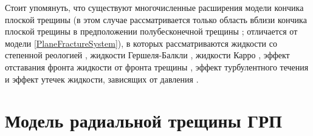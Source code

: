 Стоит упомянуть, что существуют многочисленные расширения модели кончика плоской трещины (в этом случае рассматривается только область вблизи кончика плоской трещины в предположении полубесконечной трещины \cite{baykin_course}; отличается от модели \eqref{PlaneFractureSystem}), в которых рассматриваются жидкости со степенной реологией \cite{dontsov_kresse}, жидкости Гершеля-Балкли \cite{bessmertnykh}, жидкости Карро \cite{moukhtari}, эффект отставания фронта жидкости от фронта трещины \cite{garagash}, эффект турбулентного течения \cite{dontsov_turbulent} и эффект утечек жидкости, зависящих от давления \cite{kanin}.

\section{Модель радиальной трещины ГРП}
\vspace*{-5mm}

